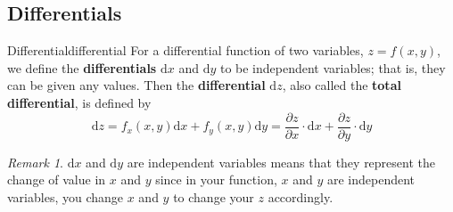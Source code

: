 \documentclass[math,code]{amznotes}
\theoremstyle{remark}
\newtheorem*{remark}{Remark}
\begin{document}
\subsection{Differentials}
\begin{dfnbox}{Differential}{differential}
    For a differential function of two variables, $z=f(x,y)$, we define the {\color{red} \textbf{differentials}} $\mathrm d x$ and $\mathrm d y$ to be independent variables; that is, they can be given any values. Then the {\color{red} \textbf{differential}} $\mathrm d z$, also called the {\color{red} \textbf{total differential}}, is defined by
    \begin{equation} \label{eq:two-varaibles-differentials}
        \mathrm d z=f_x(x,y)\mathrm d x+f_y(x,y)\mathrm d y=\frac{\partial z}{\partial x}\cdot \mathrm d x+\frac{\partial z}{\partial y}\cdot \mathrm d y
    \end{equation}
\end{dfnbox}
\begin{notebox}
    \begin{remark}
        $\mathrm d x$ and $\mathrm d y$ are independent variables means that they represent the change of value in $x$ and $y$ since in your function, $x$ and $y$ are independent variables, you change $x$ and $y$ to change your $z$ accordingly.
    \end{remark}
\end{notebox}
\end{document}
